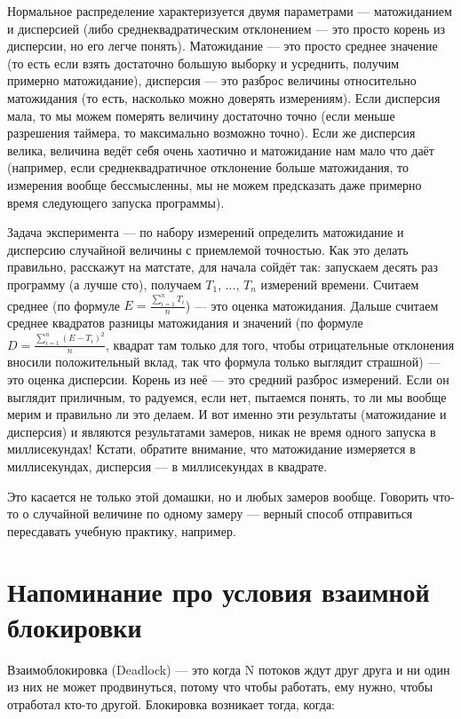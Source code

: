 \documentclass[a5paper]{article}
\begin{document}
Нормальное распределение характеризуется двумя параметрами --- матожиданием и дисперсией (либо среднеквадратическим отклонением --- это просто корень из дисперсии, но его легче понять). Матожидание --- это просто среднее значение (то есть если взять достаточно большую выборку и усреднить, получим примерно матожидание), дисперсия --- это разброс величины относительно матожидания (то есть, насколько можно доверять измерениям). Если дисперсия мала, то мы можем померять величину достаточно точно (если меньше разрешения таймера, то максимально возможно точно). Если же дисперсия велика, величина ведёт себя очень хаотично и матожидание нам мало что даёт (например, если среднеквадратичное отклонение больше матожидания, то измерения вообще бессмысленны, мы не можем предсказать даже примерно время следующего запуска программы). 

Задача эксперимента --- по набору измерений определить матожидание и дисперсию случайной величины с приемлемой точностью. Как это делать правильно, расскажут на матстате, для начала сойдёт так: запускаем десять раз программу (а лучше сто), получаем $T_1$, ..., $T_n$ измерений времени. Считаем среднее (по формуле $E = \frac{\sum_{i = 1}^{n}T_i}{n}$) --- это оценка матожидания. Дальше считаем среднее квадратов разницы матожидания и значений (по формуле $D = \frac{\sum_{i = 1}^{n}(E - T_i)^2}{n}$, квадрат там только для того, чтобы отрицательные отклонения вносили положительный вклад, так что формула только выглядит страшной) --- это оценка дисперсии. Корень из неё --- это средний разброс измерений. Если он выглядит приличным, то радуемся, если нет, пытаемся понять, то ли мы вообще мерим и правильно ли это делаем. И вот именно эти результаты (матожидание и дисперсия) и являются результатами замеров, никак не время одного запуска в миллисекундах! Кстати, обратите внимание, что матожидание измеряется в миллисекундах, дисперсия --- в миллисекундах в квадрате.

Это касается не только этой домашки, но и любых замеров вообще. Говорить что-то о случайной величине по одному замеру --- верный способ отправиться пересдавать учебную практику, например.

\section{Напоминание про условия взаимной блокировки}

Взаимоблокировка (Deadlock) --- это когда N потоков ждут друг друга и ни один из них не может продвинуться, потому что чтобы работать, ему нужно, чтобы отработал кто-то другой. Блокировка возникает тогда, когда:
\end{document}
